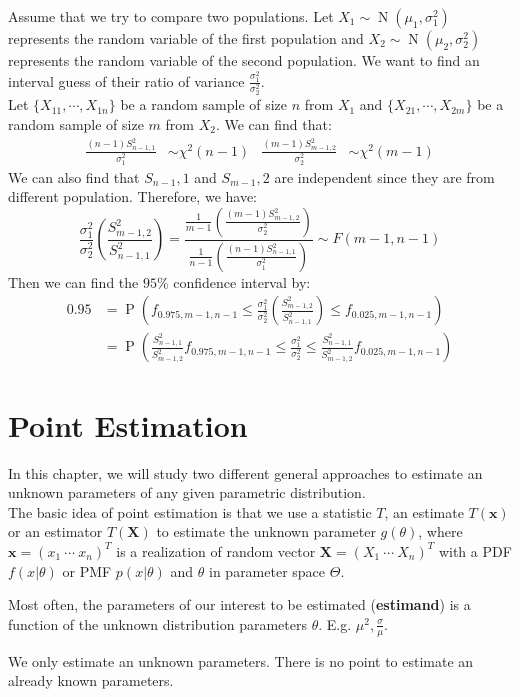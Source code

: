 \documentclass{huhtakm-template-book-v2}
\DeclareMathOperator{\prob}{P}
\DeclareMathOperator{\N}{N}
\begin{document}
\begin{eg}
	Assume that we try to compare two populations. Let $X_{1}\sim\N(\mu_{1},\sigma_{1}^{2})$ represents the random variable of the first population and $X_{2}\sim\N(\mu_{2},\sigma_{2}^{2})$ represents the random variable of the second population. We want to find an interval guess of their ratio of variance $\frac{\sigma_{1}^{2}}{\sigma_{2}^{2}}$.\\
	Let $\{X_{11},\cdots,X_{1n}\}$ be a random sample of size $n$ from $X_{1}$ and $\{X_{21},\cdots,X_{2m}\}$ be a random sample of size $m$ from $X_{2}$. We can find that:
	\begin{align*}
		\frac{(n-1)S_{n-1,1}^{2}}{\sigma_{1}^{2}}&\sim\chi^{2}(n-1) & \frac{(m-1)S_{m-1,2}^{2}}{\sigma_{2}^{2}}&\sim\chi^{2}(m-1)
	\end{align*}
	We can also find that $S_{n-1},1$ and $S_{m-1},2$ are independent since they are from different population. Therefore, we have:
	\begin{equation*}
		\frac{\sigma_{1}^{2}}{\sigma_{2}^{2}}\left(\frac{S_{m-1,2}^{2}}{S_{n-1,1}^{2}}\right)=\frac{\frac{1}{m-1}\left(\frac{(m-1)S_{m-1,2}^{2}}{\sigma_{2}^{2}}\right)}{\frac{1}{n-1}\left(\frac{(n-1)S_{n-1,1}^{2}}{\sigma_{1}^{2}}\right)}\sim F(m-1,n-1)
	\end{equation*}
	Then we can find the $95\%$ confidence interval by:
	\begin{align*}
		0.95&=\prob\left(f_{0.975,m-1,n-1}\leq\frac{\sigma_{1}^{2}}{\sigma_{2}^{2}}\left(\frac{S_{m-1,2}^{2}}{S_{n-1,1}^{2}}\right)\leq f_{0.025,m-1,n-1}\right)\\
		&=\prob\left(\frac{S_{n-1,1}^{2}}{S_{m-1,2}^{2}}f_{0.975,m-1,n-1}\leq\frac{\sigma_{1}^{2}}{\sigma_{2}^{2}}\leq \frac{S_{n-1,1}^{2}}{S_{m-1,2}^{2}}f_{0.025,m-1,n-1}\right)
	\end{align*}
\end{eg}

\chapter{Point Estimation}
In this chapter, we will study two different general approaches to estimate an unknown parameters of any given parametric distribution.\\
The basic idea of point estimation is that we use a statistic $T$, an estimate $T(\mathbf{x})$ or an estimator $T(\mathbf{X})$ to estimate the unknown parameter $g(\theta)$, where $\mathbf{x}=(x_{1}\ \cdots\ x_{n})^{T}$ is a realization of random vector $\mathbf{X}=(X_{1}\ \cdots\ X_{n})^{T}$ with a PDF $f(x|\theta)$ or PMF $p(x|\theta)$ and $\theta$ in parameter space $\Theta$.
\begin{rem}
	Most often, the parameters of our interest to be estimated (\textbf{estimand}) is a function of the unknown distribution parameters $\theta$. E.g. $\mu^{2},\frac{\sigma}{\mu}$.
\end{rem}
\begin{rem}
	We only estimate an unknown parameters. There is no point to estimate an already known parameters.
\end{rem}
\end{document}
